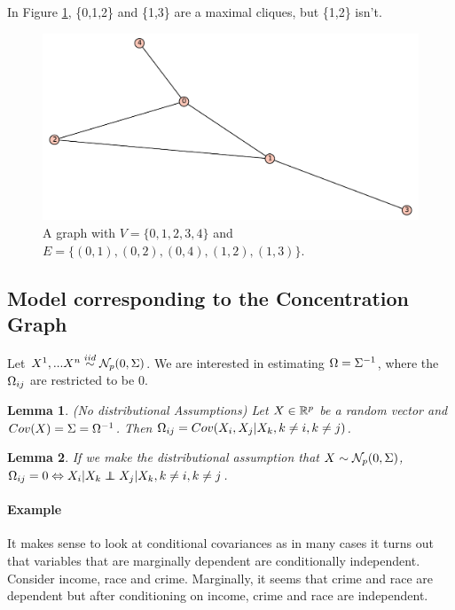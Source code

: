\documentclass[12pt, leqno]{article}
\def\rp{\ensuremath \mathbb{R}^p}
\def\s{\ensuremath\Sigma}
\def\om{\ensuremath\Omega}
\def\lra{\ensuremath\Leftrightarrow}
\def\stackrel#1#2{\mathrel{\mathop{#2}\limits^{#1}}}
\newcommand\ind{\protect\mathpalette{\protect\independenT}{\perp}}
\def\independenT#1#2{\mathrel{\rlap{$#1#2$}\mkern2mu{#1#2}}}
\newtheorem{lemma}{Lemma}[]
\begin{document}
In Figure \ref{cliqgraph}, \{0,1,2\} and \{1,3\} are a maximal cliques, but \{1,2\} isn't.
\begin{figure}
\begin{center}
  \includegraphics[scale = 0.4]{h02.pdf}
\end{center}
\caption{A graph with $V = \{0,1,2,3,4\}$ and $E = \{(0,1),(0,2),(0,4),(1,2),(1,3)\}$.}
\label{cliqgraph}
\end{figure}
\subsection{Model corresponding to the Concentration Graph}
Let $X^1, ... X^n \stackrel{iid}{\sim} \mathcal{N}_p (0, \s)$. We are
interested in estimating $\om = \s^{-1}$, where the $\om_{ij}$ are
restricted to be 0.
\begin{lemma}(No distributional Assumptions) Let $X \in \rp$ be
a random vector and $Cov(X) = \s = \om^{-1}$. Then $\om_{ij} =
Cov(X_i,X_j|X_k,k \neq i, k \neq j)$. 
\end{lemma}
\begin{lemma}
If we make the distributional assumption that $X \sim
\mathcal{N}_p(0,\s)$, $\om_{ij} = 0 \lra X_i|X_k \ind X_j|X_k, k
\neq i, k \neq j$.
\end{lemma}
\paragraph{Example} It makes sense to look at conditional
covariances as in many cases it turns out that variables that are
marginally dependent are conditionally independent. Consider income,
race and crime. Marginally, it seems that crime and race are dependent
but after conditioning on income, crime and race are independent.
\end{document}
